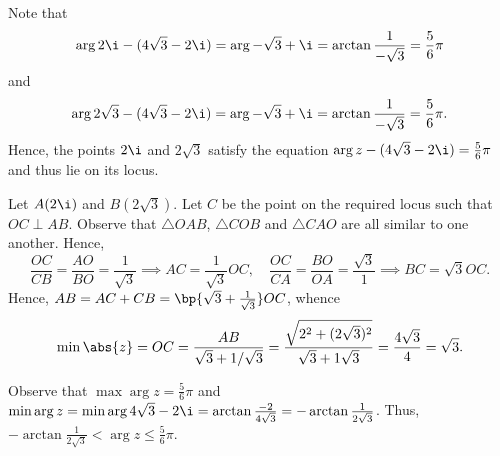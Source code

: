 \begin{solution}
\begin{center}
    \end{center}
    
    \begin{ppart}
        Note that \[\arg{2\i - (4\sqrt3 - 2\i)} = \arg{-\sqrt3 + \i} = \arctan \frac1{-\sqrt3} = \frac56\pi\] and \[\arg{2\sqrt3 - (4\sqrt3 - 2\i)} = \arg{-\sqrt3 + \i} = \arctan \frac1{-\sqrt3} = \frac56\pi.\] Hence, the points $2\i$ and $2\sqrt3$ satisfy the equation $\arg{z - (4\sqrt3 - 2\i)} = \frac56\pi$ and thus lie on its locus.
    \end{ppart}
    \begin{ppart}
        Let $A(2\i)$ and $B(2\sqrt3)$. Let $C$ be the point on the required locus such that $OC \perp AB$. Observe that $\triangle OAB$, $\triangle COB$ and $\triangle CAO$ are all similar to one another. Hence,\[\frac{OC}{CB} = \frac{AO}{BO} = \frac1{\sqrt3} \implies AC = \frac1{\sqrt3} OC, \quad \frac{OC}{CA} = \frac{BO}{OA} = \frac{\sqrt3}1 \implies BC = \sqrt3 OC.\] Hence, $AB = AC + CB = \bp{\sqrt3 + \frac1{\sqrt3}} OC$, whence \[\min \abs{z} = OC = \frac{AB}{\sqrt3 + 1/\sqrt3} = \frac{\sqrt{2^2 + (2\sqrt3)^2}}{\sqrt3 + 1\sqrt{3}} = \frac{4\sqrt3}{4} = \sqrt3.\] 
        
        Observe that $\max \arg{z} = \frac56 \pi$ and $\min \arg{z} = \min \arg{4\sqrt3 - 2\i} = \arctan \frac{-2}{4\sqrt3} = -\arctan \frac1{2\sqrt3}$. Thus, $-\arctan \frac1{2\sqrt3} < \arg{z} \leq \frac56 \pi$.
    \end{ppart}
\end{solution}


